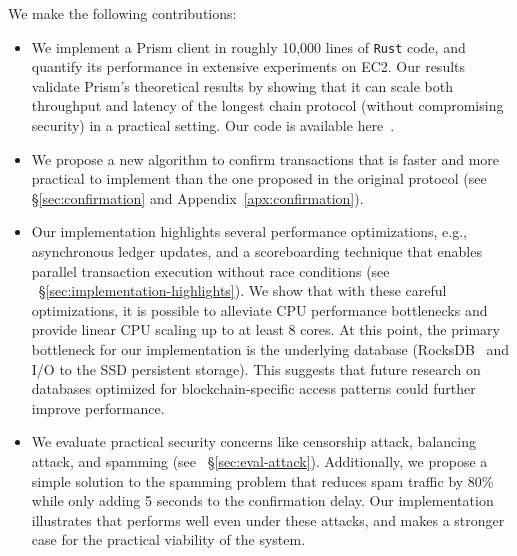 We make the following contributions:
\begin{itemize}
    \item We implement a Prism client in roughly 10,000 lines of {\tt Rust} code, and quantify its performance in extensive experiments on EC2. Our results validate Prism's theoretical results by showing that it can scale both throughput and latency of the longest chain protocol (without compromising security) in a practical setting. Our code is available here~\cite{prismcode}.
    
    \item We propose a new algorithm to confirm transactions that is faster and more practical to implement than the one proposed in the original protocol \cite{prism-theory} (see \S\ref{sec:confirmation} and Appendix~\ref{apx:confirmation}). 
    
    \item Our implementation highlights several performance optimizations, e.g., asynchronous ledger updates, and a scoreboarding technique that enables parallel transaction execution without race conditions (see ~\S\ref{sec:implementation-highlights}). We show that with these careful optimizations, it is possible to alleviate CPU performance bottlenecks and provide linear CPU scaling up to at least 8 cores. At this point, the primary bottleneck for our implementation is the underlying database (RocksDB~\cite{rocksdb} and I/O to the SSD persistent storage). This suggests that future research on databases optimized for blockchain-specific access patterns could further improve performance. 
    
    \item We evaluate practical security concerns like censorship attack, balancing attack, and spamming (see ~\S\ref{sec:eval-attack}). Additionally, we propose a simple solution to the spamming problem that reduces spam traffic by 80\% while only adding 5 seconds to the confirmation delay. Our implementation illustrates that \prism performs well even under these attacks, and makes a stronger case for the practical viability of the system.
    
\end{itemize}



